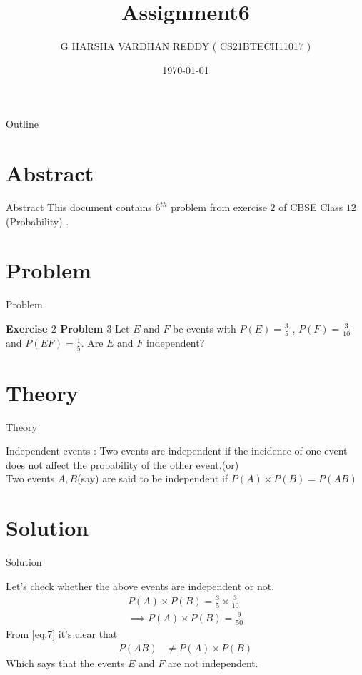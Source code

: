 \documentclass{beamer}
\title{Assignment6}
\author[CS21BTECH11017]{G HARSHA VARDHAN REDDY ( CS21BTECH11017 )}
\date{\today}
\begin{document}
\begin{frame}
    \titlepage 
\end{frame}
\begin{frame}{Outline}
    \tableofcontents
\end{frame}


\section{Abstract}
\begin{frame}{Abstract}
This document contains $6^{th}$ problem from exercise $2$ of CBSE Class $12$ (Probability) .
\end{frame}
\section{Problem}
\begin{frame}{Problem}

\textbf{Exercise $2$ Problem $3$ }Let $E$ and $F$ be events with $P(E)=\frac{3}{5}$ , $ P(F)=\frac{3}{10}$ and $P(EF)=\frac{1}{5}.$ Are
$E$ and $F$ independent?
\end{frame}

\section{Theory}
\begin{frame}{Theory}
\begin{block}{Independent events :}
Two events are independent if the incidence of one event does not affect the probability of the other event.(or)\\
Two events $A,B$(say) are said to be independent if $P(A)\times P(B)=P(AB)$

\end{block}
\end{frame} 
\section{Solution}
\begin{frame}{Solution}

Let's check whether the above events are independent or not.\\
\begin{align}
    P(A)\times P(B)=\frac{3}{5} \times \frac{3}{10}\\
    \implies P(A)\times P(B)=\frac{9}{50}\label{eq:7}
\end{align}
From \eqref{eq:7} it's clear that
\begin{align}
    P(AB)&\neq P(A)\times P(B)
\end{align}
Which says that the events $ E$ and $F$ are not independent.

\end{frame} 
\end{document}
